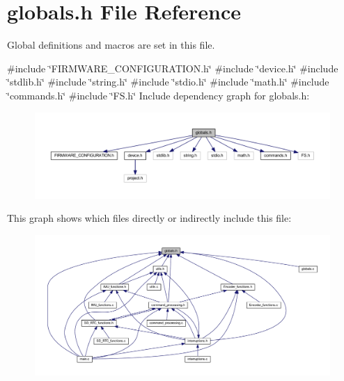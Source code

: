 \section{globals.\+h File Reference}
\label{globals_8h}


Global definitions and macros are set in this file.  


{\ttfamily \#include \char`\"{}F\+I\+R\+M\+W\+A\+R\+E\+\_\+\+C\+O\+N\+F\+I\+G\+U\+R\+A\+T\+I\+O\+N.\+h\char`\"{}}\newline
{\ttfamily \#include \char`\"{}device.\+h\char`\"{}}\newline
{\ttfamily \#include \char`\"{}stdlib.\+h\char`\"{}}\newline
{\ttfamily \#include \char`\"{}string.\+h\char`\"{}}\newline
{\ttfamily \#include \char`\"{}stdio.\+h\char`\"{}}\newline
{\ttfamily \#include \char`\"{}math.\+h\char`\"{}}\newline
{\ttfamily \#include \char`\"{}commands.\+h\char`\"{}}\newline
{\ttfamily \#include \char`\"{}F\+S.\+h\char`\"{}}\newline
Include dependency graph for globals.\+h\+:\nopagebreak
\begin{figure}[H]
\begin{center}
\leavevmode
\includegraphics[width=350pt]{globals_8h__incl}
\end{center}
\end{figure}
This graph shows which files directly or indirectly include this file\+:\nopagebreak
\begin{figure}[H]
\begin{center}
\leavevmode
\includegraphics[width=350pt]{globals_8h__dep__incl}
\end{center}
\end{figure}
